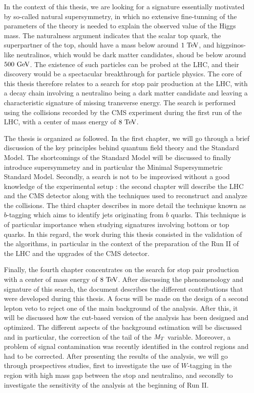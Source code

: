 In the context of this thesis, we are looking for a signature essentially motivated by
so-called natural supersymmetry, in which no extensive fine-tunning of the parameters of
the theory is needed to explain the observed value of the Higgs mass. The naturalness
argument indicates that the scalar top quark, the superpartner of the top, should have
a mass below around $1~\text{TeV}$, and higgsinos-like neutralinos, which would be dark matter
candidates, shoud be below around $500~\text{GeV}$. The existence of such particles can be probed
at the LHC, and their discovery would be a spectacular breakthrough for particle physics.
The core of this thesis therefore relates to a search for stop pair production at the LHC,
with a decay chain involving a neutralino being a dark matter candidate and leaving a
characteristic signature of missing transverse energy. The search is performed using the
collisions recorded by the CMS experiment during the first run of the LHC, with a center
of mass energy of $8~\text{TeV}$.

The thesis is organized as followed. In the first chapter, we will go through a brief
discussion of the key principles behind quantum field theory and the Standard Model. The
shortcomings of the Standard Model will be discussed to finally introduce supersymmetry
and in particular the Minimal Supersymmetric Standard Model. Secondly, a search is not to
be improvised without a good knowledge of the experimental setup : the second chapter will
describe the LHC and the CMS detector along with the techniques used to reconstruct and
analyze the collisions. The third chapter describes in more detail the technique known
as $b$-tagging which aims to identify jets originating from $b$ quarks. This technique is
of particular importance when studying signatures involving bottom or top quarks. In this
regard, the work during this thesis consisted in the validation of the algorithms, in
particular in the context of the preparation of the Run II of the LHC and the upgrades of
the CMS detector.

Finally, the fourth chapter concentrates on the search for stop pair production with a center
of mass energy of $8~\text{TeV}$. After discussing the phenomenology and signature of this search,
the document describes the different contributions that were developed during this thesis.
A focus will be made on the design of a second lepton veto to reject one of the main background
of the analysis. After this, it will be discussed how the cut-based version of the analysis
has been designed and optimized. The different aspects of the background estimation will
be discussed and in particular, the correction of the tail of the $M_T$ variable. Moreover,
a problem of signal contamination was recently identified in the control regions and had
to be corrected. After presenting the results of the analysis, we will go through prospectives
studies, first to investigate the use of $W$-tagging in the region with high mass gap
between the stop and neutralino, and secondly to investigate the sensitivity of the analysis
at the beginning of Run II.

